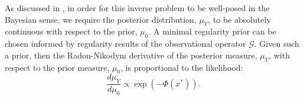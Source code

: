 \documentclass[final]{siamltex}
\begin{document}
As discussed in \cite{stuart2010inverse,cotter2009bayesian},
in order for this inverse problem to be well-posed in the Bayesian
sense, we require the posterior distribution, $\mu_Y$, to be absolutely
continuous with respect to the prior, $\mu_0$. A
minimal regularity prior can be chosen informed by regularity results
of the observational operator $\mathcal{G}$. Given such a prior, then
the Radon-Nikodym derivative of the posterior measure, $\mu_Y$, with
respect to the prior measure, $\mu_0$, is proportional to the
likelihood:
\begin{equation}\label{eqn:RND}
	\frac{d\mu_Y}{d\mu_0} \propto \exp \left ( -\Phi(x^*) \right ).
\end{equation}


\end{document}
